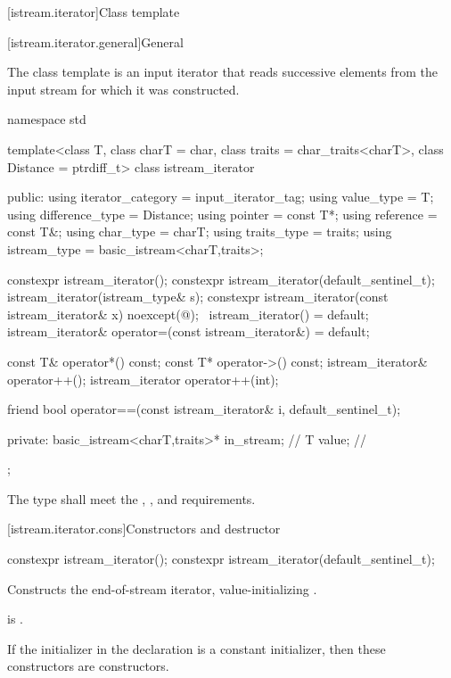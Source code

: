 [istream.iterator]{Class template }

[istream.iterator.general]{General}

\pnum
{}%
The class template 
is an input iterator that reads successive elements
from the input stream for which it was constructed.

\begin{codeblock}
namespace std {
  template<class T, class charT = char, class traits = char_traits<charT>,
           class Distance = ptrdiff_t>
  class istream_iterator {
  public:
    using iterator_category = input_iterator_tag;
    using value_type        = T;
    using difference_type   = Distance;
    using pointer           = const T*;
    using reference         = const T&;
    using char_type         = charT;
    using traits_type       = traits;
    using istream_type      = basic_istream<charT,traits>;

    constexpr istream_iterator();
    constexpr istream_iterator(default_sentinel_t);
    istream_iterator(istream_type& s);
    constexpr istream_iterator(const istream_iterator& x) noexcept(@\seebelow@);
    ~istream_iterator() = default;
    istream_iterator& operator=(const istream_iterator&) = default;

    const T& operator*() const;
    const T* operator->() const;
    istream_iterator& operator++();
    istream_iterator  operator++(int);

    friend bool operator==(const istream_iterator& i, default_sentinel_t);

  private:
    basic_istream<charT,traits>* in_stream; // \expos
    T value;                                // \expos
  };
}
\end{codeblock}

\pnum
The type  shall meet the ,
, and  requirements.

[istream.iterator.cons]{Constructors and destructor}

%
\begin{itemdecl}
constexpr istream_iterator();
constexpr istream_iterator(default_sentinel_t);
\end{itemdecl}

\begin{itemdescr}
\pnum
\effects
Constructs the end-of-stream iterator, value-initializing .

\pnum
\ensures
{} is .

\pnum
\remarks
If the initializer  in the declaration 
is a constant initializer,
then these constructors are  constructors.
\end{itemdescr}


